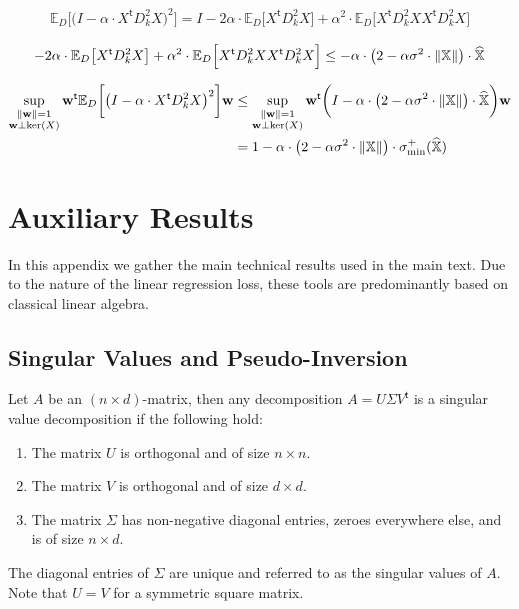 \documentclass{article}
\newcommand*{\E}{\mathbb{E}} %
\newcommand*{\bbX}{\mathbb{X}}
\newcommand*{\bfw}{\mathbf{w}}
\newcommand*{\tran}{^{\mathsf{t}}}
\newcommand*{\sigminp}{\sigma_{\mathrm{min}}^+}
\DeclarePairedDelimiter{\norm}{\lVert}{\rVert}
\newcommand{\whbbX}{\widehat{\bbX}}
\begin{document}
\begin{align*}
  \E_D\bigg[\big(I - \alpha \cdot X\tran D_k^2 X\big)^2\bigg] = I - 2 \alpha
  \cdot \E_D\big[X\tran D_k^2 X\big] + \alpha^2 \cdot \E_D\Big[X\tran D_k^2 X
  X\tran D_k^2 X\Big]
\end{align*}

\begin{align*}
  - 2 \alpha \cdot \E_D\big[X\tran D_k^2 X\big] + \alpha^2 \cdot \E_D\Big[X\tran
  D_k^2 X X\tran D_k^2 X\Big] \leq - \alpha \cdot \big(2 - \alpha \sigma^2 \cdot
  \norm{\bbX}\big) \cdot \whbbX
\end{align*}

\begin{align*}
   \sup_{\substack{\norm{\bfw} = 1\\ \bfw \perp \ker(X)}} \bfw\tran
   \E_D\bigg[\big(I - \alpha \cdot X\tran D_k^2 X\big)^2\bigg] \bfw &\leq
   \sup_{\substack{\norm{\bfw} = 1\\ \bfw \perp \ker(X)}} \bfw\tran \bigg(I -
   \alpha \cdot \big(2 - \alpha \sigma^2 \cdot \norm{\bbX}\big) \cdot
   \whbbX\bigg) \bfw\\
   &= 1 - \alpha \cdot \big(2 - \alpha \sigma^2 \cdot \norm{\bbX}\big) \cdot
   \sigminp(\whbbX)
\end{align*}

\section{Auxiliary Results}

In this appendix we gather the main technical results used in the main text. Due
to the nature of the linear regression loss, these tools are predominantly based
on classical linear algebra.

\subsection{Singular Values and Pseudo-Inversion}
\label{sec::svalue_pinv}

Let $A$ be an $(n \times d)$-matrix, then any decomposition $A = U \Sigma
V\tran$ is a singular value decomposition if the following hold: \begin{enumerate}
  \item The matrix $U$ is orthogonal and of size $n \times n$.
  \item The matrix $V$ is orthogonal and of size $d \times d$.
  \item The matrix $\Sigma$ has non-negative diagonal entries, zeroes everywhere
    else, and is of size $n \times d$.
\end{enumerate} The diagonal entries of $\Sigma$ are unique and referred to as
the singular values of $A$. Note that $U = V$ for a symmetric square matrix.
\end{document}
